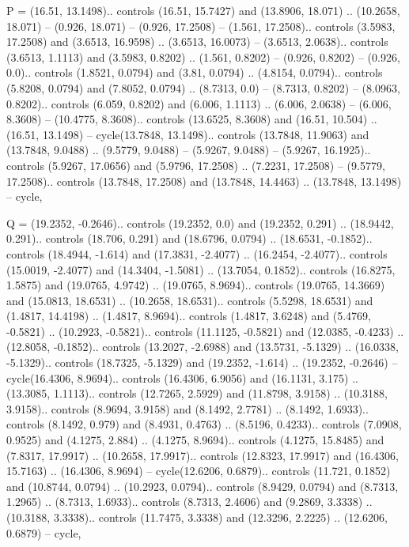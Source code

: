 P = {(16.51, 13.1498).. controls (16.51, 15.7427) and (13.8906, 18.071) .. (10.2658, 18.071) -- (0.926, 18.071) -- (0.926, 17.2508) -- (1.561, 17.2508).. controls (3.5983, 17.2508) and (3.6513, 16.9598) .. (3.6513, 16.0073) -- (3.6513, 2.0638).. controls (3.6513, 1.1113) and (3.5983, 0.8202) .. (1.561, 0.8202) -- (0.926, 0.8202) -- (0.926, 0.0).. controls (1.8521, 0.0794) and (3.81, 0.0794) .. (4.8154, 0.0794).. controls (5.8208, 0.0794) and (7.8052, 0.0794) .. (8.7313, 0.0) -- (8.7313, 0.8202) -- (8.0963, 0.8202).. controls (6.059, 0.8202) and (6.006, 1.1113) .. (6.006, 2.0638) -- (6.006, 8.3608) -- (10.4775, 8.3608).. controls (13.6525, 8.3608) and (16.51, 10.504) .. (16.51, 13.1498) -- cycle(13.7848, 13.1498).. controls (13.7848, 11.9063) and (13.7848, 9.0488) .. (9.5779, 9.0488) -- (5.9267, 9.0488) -- (5.9267, 16.1925).. controls (5.9267, 17.0656) and (5.9796, 17.2508) .. (7.2231, 17.2508) -- (9.5779, 17.2508).. controls (13.7848, 17.2508) and (13.7848, 14.4463) .. (13.7848, 13.1498) -- cycle},

Q = {(19.2352, -0.2646).. controls (19.2352, 0.0) and (19.2352, 0.291) .. (18.9442, 0.291).. controls (18.706, 0.291) and (18.6796, 0.0794) .. (18.6531, -0.1852).. controls (18.4944, -1.614) and (17.3831, -2.4077) .. (16.2454, -2.4077).. controls (15.0019, -2.4077) and (14.3404, -1.5081) .. (13.7054, 0.1852).. controls (16.8275, 1.5875) and (19.0765, 4.9742) .. (19.0765, 8.9694).. controls (19.0765, 14.3669) and (15.0813, 18.6531) .. (10.2658, 18.6531).. controls (5.5298, 18.6531) and (1.4817, 14.4198) .. (1.4817, 8.9694).. controls (1.4817, 3.6248) and (5.4769, -0.5821) .. (10.2923, -0.5821).. controls (11.1125, -0.5821) and (12.0385, -0.4233) .. (12.8058, -0.1852).. controls (13.2027, -2.6988) and (13.5731, -5.1329) .. (16.0338, -5.1329).. controls (18.7325, -5.1329) and (19.2352, -1.614) .. (19.2352, -0.2646) -- cycle(16.4306, 8.9694).. controls (16.4306, 6.9056) and (16.1131, 3.175) .. (13.3085, 1.1113).. controls (12.7265, 2.5929) and (11.8798, 3.9158) .. (10.3188, 3.9158).. controls (8.9694, 3.9158) and (8.1492, 2.7781) .. (8.1492, 1.6933).. controls (8.1492, 0.979) and (8.4931, 0.4763) .. (8.5196, 0.4233).. controls (7.0908, 0.9525) and (4.1275, 2.884) .. (4.1275, 8.9694).. controls (4.1275, 15.8485) and (7.8317, 17.9917) .. (10.2658, 17.9917).. controls (12.8323, 17.9917) and (16.4306, 15.7163) .. (16.4306, 8.9694) -- cycle(12.6206, 0.6879).. controls (11.721, 0.1852) and (10.8744, 0.0794) .. (10.2923, 0.0794).. controls (8.9429, 0.0794) and (8.7313, 1.2965) .. (8.7313, 1.6933).. controls (8.7313, 2.4606) and (9.2869, 3.3338) .. (10.3188, 3.3338).. controls (11.7475, 3.3338) and (12.3296, 2.2225) .. (12.6206, 0.6879) -- cycle},

